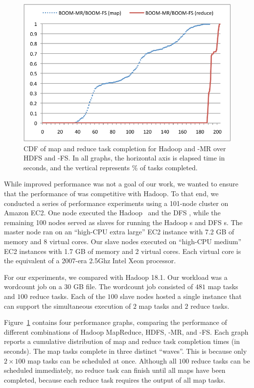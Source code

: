 \begin{figure}[t]
\begin{minipage}{0.5\linewidth}
\end{minipage}
\begin{minipage}{0.5\linewidth}
        \includegraphics[width=0.95\linewidth]{graphs/bmr_bfs}
\end{minipage}
\caption{CDF of map and reduce task completion for Hadoop and \BOOM-MR
  over HDFS and \BOOM-FS.  In all graphs, the horizontal axis is
  elapsed time in seconds, and the vertical represents \% of tasks completed.}
\label{fig:ec2experiment}
\vspace{-10pt}
\end{figure}

While improved performance was not a goal of our work, we wanted to
ensure that the performance of \BOOMA was competitive with Hadoop. To
that end, we conducted a series of performance experiments using a
101-node cluster on Amazon EC2. One node executed the Hadoop \JT\ and
the DFS \NN, while the remaining 100 nodes served as slaves for
running the Hadoop {\TT}s and DFS {\DN}s. The master node ran on an
``high-CPU extra large'' EC2 instance with 7.2 GB of memory and 8
virtual cores. Our slave nodes executed on ``high-CPU medium'' EC2
instances with 1.7 GB of memory and 2 virtual cores. Each virtual core
is the equivalent of a 2007-era 2.5Ghz Intel Xeon processor.

For our experiments, we compared \BOOMA with Hadoop 18.1. Our workload
was a wordcount job on a 30 GB file. The wordcount job consisted of
$481$ map tasks and $100$ reduce tasks. Each of the $100$ slave nodes
hosted a single \TT instance that can support the simultaneous
execution of $2$ map tasks and $2$ reduce tasks.

Figure~\ref{fig:ec2experiment} contains four performance graphs,
comparing the performance of different combinations of Hadoop
MapReduce, HDFS, \BOOM-MR, and \BOOM-FS. Each graph reports a
cumulative distribution of map and reduce task completion times (in
seconds).  The map tasks complete in three distinct ``waves''. This is
because only $2\times100$ map tasks can be scheduled at once. Although
all $100$ reduce tasks can be scheduled immediately, no reduce task
can finish until all maps have been completed, because each reduce
task requires the output of all map tasks.

